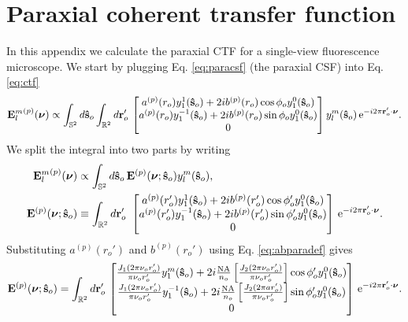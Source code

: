 \documentclass[11pt]{article}
\newcommand{\me}{\mathrm{e}}
\providecommand{\mb}[1]{\mathbf{#1}}
\providecommand{\ro}[1]{\mathbf{\mathbf{r}}_o}
\providecommand{\so}[1]{\mathbf{\hat{s}}_o}
\providecommand{\bs}[1]{\boldsymbol{#1}}
\begin{document}
\section{Paraxial coherent transfer function}\label{paraxialctf}
In this appendix we calculate the paraxial CTF for a single-view fluorescence
microscope. We start by plugging Eq. \ref{eq:paracsf} (the paraxial CSF) into Eq.
\ref{eq:ctf}
\begin{align}
  {\mb{E}_l^m}^{(p)}(\bs{\nu}) \propto \int_{\mathbb{S}^2}d\so{}\int_{\mathbb{R}^2}d\ro{}'\,
\begin{bmatrix}
    a^{(p)}(r_o)y_1^{1}(\so{}) + 2ib^{(p)}(r_o)\cos\phi_o y_1^{0}(\so{})\\
    a^{(p)}(r_o)y_1^{-1}(\so{}) + 2ib^{(p)}(r_o)\sin\phi_o y_1^{0}(\so{})\\
    0\\
  \end{bmatrix}
  y_l^m(\so{})\thinspace\me^{-i 2\pi\ro{}'\cdot\bs{\nu}}. 
\end{align}
We split the integral into two parts by writing
\begin{align}
  {\mb{E}_l^m}^{(p)}(\bs{\nu}) &\propto \int_{\mathbb{S}^2}d\so{}\, \mb{E}^{(p)}(\bs{\nu};\so{}) y_l^m(\so{}),\\ \label{eq:splitup}
  \mb{E}^{(p)}(\bs{\nu};\so{}) &\equiv  \int_{\mathbb{R}^2}d\ro{}'\
\begin{bmatrix}
    a^{(p)}(r_o')y_1^{1}(\so{}) + 2ib^{(p)}(r_o')\cos\phi_o'y_1^{0}(\so{})\\
    a^{(p)}(r_o')y_1^{-1}(\so{}) + 2ib^{(p)}(r_o')\sin\phi_o'y_1^{0}(\so{})\\
    0\\
  \end{bmatrix}
  \thinspace\me^{-i 2\pi\ro{}'\cdot\bs{\nu}}. 
\end{align}
Substituting $a^{(p)}(r_o')$ and $b^{(p)}(r_o')$ using Eq. \ref{eq:abparadef} gives
\begin{align}
  \mb{E}^{(p)}(\bs{\nu}; \so{}) = \int_{\mathbb{R}^2}d\ro{}'\,
\begin{bmatrix}
    \frac{J_1(2\pi \nu_or_o')}{\pi \nu_or_o'}y_1^m(\so{}) + 2i\frac{\text{NA}}{n_o}\left[\frac{J_2(2\pi \nu_or_o')}{\pi \nu_or_o'}\right]\cos\phi_o'y_1^0(\so{})\\
    \frac{J_1(2\pi \nu_or_o')}{\pi \nu_or_o'}y_1^{-1}(\so{}) + 2i\frac{\text{NA}}{n_o}\left[\frac{J_2(2\pi ar_o')}{\pi \nu_or_o'}\right]\sin\phi_o'y_1^0(\so{})\\
    0\\
  \end{bmatrix}
  \thinspace\me^{-i 2\pi\ro{}'\cdot\bs{\nu}}.
\end{align}
\end{document}
